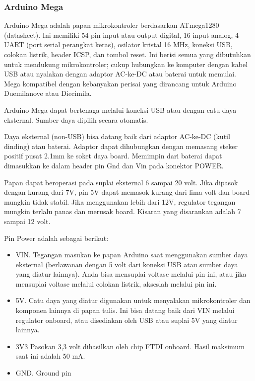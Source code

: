 \subsubsection{Arduino Mega}

Arduino Mega adalah papan mikrokontroler berdasarkan ATmega1280 (datasheet). Ini memiliki 54 pin input atau output digital, 16 input analog, 4 UART (port serial perangkat keras), osilator kristal 16 MHz, koneksi USB, colokan listrik, header ICSP, dan tombol reset. Ini berisi semua yang dibutuhkan untuk mendukung mikrokontroler; cukup hubungkan ke komputer dengan kabel USB atau nyalakan dengan adaptor AC-ke-DC atau baterai untuk memulai. Mega kompatibel dengan kebanyakan perisai yang dirancang untuk Arduino Duemilanove atau Diecimila.

Arduino Mega dapat bertenaga melalui koneksi USB atau dengan catu daya eksternal. Sumber daya dipilih secara otomatis.

Daya eksternal (non-USB) bisa datang baik dari adaptor AC-ke-DC (kutil dinding) atau baterai. Adaptor dapat dihubungkan dengan memasang steker positif pusat 2.1mm ke soket daya board. Memimpin dari baterai dapat dimasukkan ke dalam header pin Gnd dan Vin pada konektor POWER.

Papan dapat beroperasi pada suplai eksternal 6 sampai 20 volt. Jika dipasok dengan kurang dari 7V, pin 5V dapat memasok kurang dari lima volt dan board mungkin tidak stabil. Jika menggunakan lebih dari 12V, regulator tegangan mungkin terlalu panas dan merusak board. Kisaran yang disarankan adalah 7 sampai 12 volt.

Pin Power adalah sebagai berikut:
\begin{itemize}
\item VIN. Tegangan masukan ke papan Arduino saat menggunakan sumber daya eksternal (berlawanan dengan 5 volt dari koneksi USB atau sumber daya yang diatur lainnya). Anda bisa mensuplai voltase melalui pin ini, atau jika mensuplai voltase melalui colokan listrik, akseslah melalui pin ini.
\item 5V. Catu daya yang diatur digunakan untuk menyalakan mikrokontroler dan komponen lainnya di papan tulis. Ini bisa datang baik dari VIN melalui regulator onboard, atau disediakan oleh USB atau suplai 5V yang diatur lainnya.
\item 3V3 Pasokan 3,3 volt dihasilkan oleh chip FTDI onboard. Hasil maksimum saat ini adalah 50 mA.
\item GND. Ground pin
\end{itemize}

